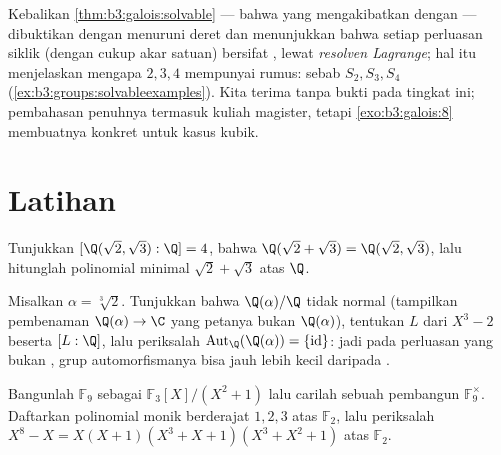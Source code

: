 \begin{remark}\label{rem:b3:galois:converse}
Kebalikan \cref{thm:b3:galois:solvable} --- bahwa 
yang  mengakibatkan  dengan  --- dibuktikan dengan
menuruni deret  dan menunjukkan bahwa setiap perluasan siklik
(dengan cukup akar satuan) bersifat , lewat \emph{resolven
Lagrange}; hal itu menjelaskan mengapa  $2, 3, 4$ mempunyai rumus:
sebab $S_2, S_3, S_4$ 
(\cref{ex:b3:groups:solvableexamples}). Kita terima tanpa bukti pada
tingkat ini; pembahasan penuhnya termasuk kuliah magister, tetapi
\cref{exo:b3:galois:8} membuatnya konkret untuk kasus kubik.
\end{remark}

\section{Latihan}

\begin{exercise}[$\star$]\label{exo:b3:galois:1}
Tunjukkan $[\Q(\sqrt2, \sqrt3):\Q] = 4$, bahwa $\Q(\sqrt2 + \sqrt3) =
\Q(\sqrt2, \sqrt3)$, lalu hitunglah polinomial minimal
$\sqrt2 + \sqrt3$ atas $\Q$.
\end{exercise}

\begin{exercise}[$\star$]\label{exo:b3:galois:2}
Misalkan $\alpha = \sqrt[3]2$. Tunjukkan bahwa $\Q(\alpha)/\Q$ tidak
normal (tampilkan pembenaman $\Q(\alpha) \to \C$ yang petanya
bukan $\Q(\alpha)$), tentukan  $L$ dari $X^3 -
2$ beserta $[L:\Q]$, lalu periksalah $\operatorname{Aut}_\Q(\Q(\alpha)) =
\{\mathrm{id}\}$: jadi pada perluasan yang bukan , grup
automorfismanya bisa jauh lebih kecil daripada .
\end{exercise}

\begin{exercise}[$\star$]\label{exo:b3:galois:3}
Bangunlah $\mathbb F_9$ sebagai $\mathbb F_3[X]/(X^2+1)$ lalu carilah
sebuah pembangun $\mathbb F_9^\times$. Daftarkan polinomial monik 
berderajat $1, 2, 3$ atas $\mathbb F_2$, lalu periksalah
$X^8 - X = X(X+1)(X^3+X+1)(X^3+X^2+1)$ atas $\mathbb F_2$.
\end{exercise}

